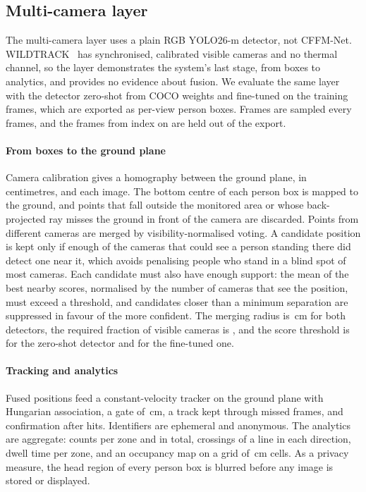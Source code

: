 \subsection{Multi-camera layer}
The multi-camera layer uses a plain RGB YOLO26-m detector, not CFFM-Net. WILDTRACK~\cite{chavdarova2018wildtrack} has \cfgCamViews{} synchronised, calibrated visible cameras and no thermal channel, so the layer demonstrates the system's last stage, from boxes to analytics, and provides no evidence about fusion. We evaluate the same layer with the detector zero-shot from COCO weights and fine-tuned on the training frames, which are exported as per-view person boxes. Frames are sampled every \cfgWtStep{} frames, and the frames from index \cfgWtTestFrom{} on are held out of the export.

\paragraph{From boxes to the ground plane}
Camera calibration gives a homography between the ground plane, in centimetres, and each image. The bottom centre of each person box is mapped to the ground, and points that fall outside the monitored area or whose back-projected ray misses the ground in front of the camera are discarded. Points from different cameras are merged by visibility-normalised voting. A candidate position is kept only if enough of the cameras that could see a person standing there did detect one near it, which avoids penalising people who stand in a blind spot of most cameras. Each candidate must also have enough support: the mean of the best nearby scores, normalised by the number of cameras that see the position, must exceed a threshold, and candidates closer than a minimum separation are suppressed in favour of the more confident. The merging radius is \camFusionFineTunedRadius{}\,cm for both detectors, the required fraction of visible cameras is \camFusionFineTunedMinRatio{}, and the score threshold is \camFusionZeroShotMinScore{} for the zero-shot detector and \camFusionFineTunedMinScore{} for the fine-tuned one.

\paragraph{Tracking and analytics}
Fused positions feed a constant-velocity tracker on the ground plane with Hungarian association, a gate of \cfgTrackGate{}\,cm, a track kept through \cfgTrackMiss{} missed frames, and confirmation after \cfgTrackHits{} hits. Identifiers are ephemeral and anonymous. The analytics are aggregate: counts per zone and in total, crossings of a line in each direction, dwell time per zone, and an occupancy map on a grid of \cfgGroundCell{}\,cm cells. As a privacy measure, the head region of every person box is blurred before any image is stored or displayed.

